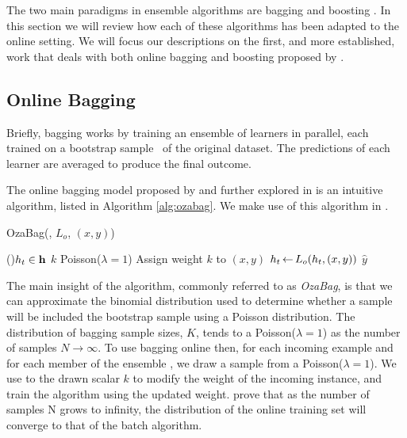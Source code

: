 The two main paradigms in ensemble algorithms are bagging \cite{bagging} and boosting \cite{boosting-freund, boosting-schapire}. In this section we will review how each of these algorithms
has been adapted to the online setting. We will focus our descriptions on the first, and more established,
work that deals with both online bagging and boosting proposed by \citet{Oza2001online}.

\subsection{Online Bagging}

Briefly, bagging works by training an ensemble of learners in parallel,
each trained on a bootstrap sample~\cite{bootstrap} of the original dataset.
The predictions of each learner are averaged to produce the final outcome.

The online bagging model proposed by \citet{Oza2001online} and further explored in
\cite{online-bagging-experiments} is an intuitive algorithm, listed in Algorithm
\ref{alg:ozabag}. We make use of this algorithm in \uncertaintrees.

\begin{algorithm}
	\small
	\caption{OzaBag(\ensemble, $L_o$, $(x,y)$)}
	\label{alg:ozabag}

	\ForEach(){$h_t \in \mathbf{h}$}{
		$k$  Poisson($\lambda = 1$) \;
		Assign weight $k$ to $(x,y)$ \;
		$h_t {\,\leftarrow\,} L_o(h_t, (x,y))$
	}
	\Return $\widehat{y}$ \;
\end{algorithm}

The main insight of the algorithm, commonly referred to as \emph{OzaBag}, is that we can approximate the binomial distribution
used to determine whether a sample will be included the bootstrap
sample using a Poisson distribution. The distribution of bagging sample sizes, $K$, tends
to a Poisson($\lambda = 1$) as the number of samples $N \rightarrow \infty$. To use bagging online then,
for each incoming example and
for each member of the ensemble \ensemble, we draw a sample from a Poisson($\lambda = 1$). We use to the drawn scalar $k$ to modify the weight of the incoming instance, and train the algorithm using the updated weight. \citet{Oza2001online} prove that as the number of samples N grows
to infinity, the distribution of the online training set will converge to that of the batch algorithm.

